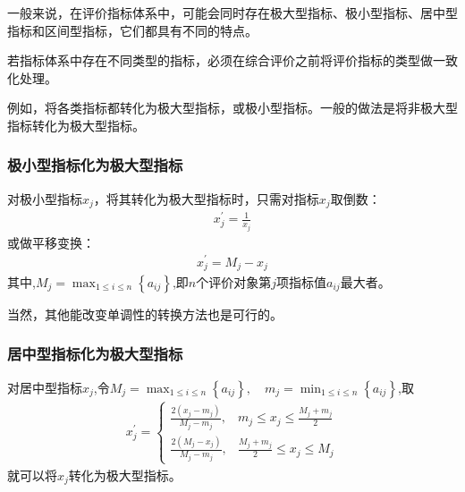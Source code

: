 \documentclass[letterpaper,10pt,english]{sphinxmanual}
\begin{document}
一般来说，在评价指标体系中，可能会同时存在极大型指标、极小型指标、居中型指标和区间型指标，它们都具有不同的特点。

若指标体系中存在不同类型的指标，必须在综合评价之前将评价指标的类型做一致化处理。

例如，将各类指标都转化为极大型指标，或极小型指标。一般的做法是将非极大型指标转化为极大型指标。


\subsubsection{极小型指标化为极大型指标}
\label{\detokenize{docs/evaluation_model:id8}}
对极小型指标\(x_j\)，将其转化为极大型指标时，只需对指标\(x_j\)取倒数：
\begin{equation*}
\begin{split}
x_{j}^{\prime}=\frac{1}{x_{j}}
\end{split}
\end{equation*}
或做平移变换：
\begin{equation*}
\begin{split}
x_{j}^{\prime}=M_{j}-x_{j}
\end{split}
\end{equation*}
其中,\(M_{j}=\max _{1 \leq i \leq n}\left\{a_{i j}\right\}\),即\(n\)个评价对象第\(j\)项指标值\(a_{ij}\)最大者。

当然，其他能改变单调性的转换方法也是可行的。


\subsubsection{居中型指标化为极大型指标}
\label{\detokenize{docs/evaluation_model:id9}}
对居中型指标\(x_j\),令\(M_{j}=\max _{1 \leq i \leq n}\left\{a_{i j}\right\}, \quad m_{j}=\min _{1 \leq i \leq n}\left\{a_{i j}\right\}\),取
\begin{equation*}
\begin{split}
x_{j}^{\prime}=\left\{\begin{array}{ll}
{\frac{2\left(x_{j}-m_{j}\right)}{M_{j}-m_{j}},} & {m_{j} \leq x_{j} \leq \frac{M_{j}+m_{j}}{2}} \\
{\frac{2\left(M_{j}-x_{j}\right)}{M_{j}-m_{j}},} & {\frac{M_{j}+m_{j}}{2} \leq x_{j} \leq M_{j}}
\end{array}\right.
\end{split}
\end{equation*}
就可以将\(x_j\)转化为极大型指标。
\end{document}
